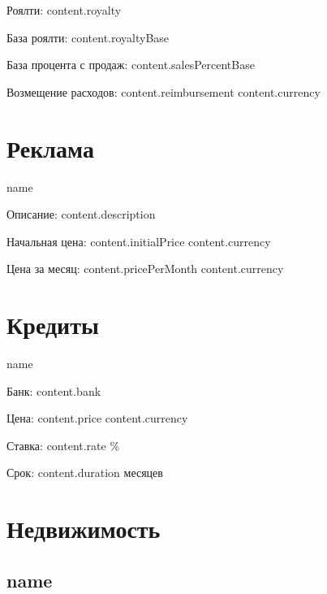 \documentclass[a4paper,12pt]{article}
\begin{document}
{{{{{{{{      Роялти: {{ content.royalty }}
      
      База роялти: {{ content.royaltyBase }}
      
      База процента с продаж: {{ content.salesPercentBase }}

      Возмещение расходов: {{ content.reimbursement }} {{ content.currency }}
  {%
{%

{%
  \section{Реклама}
  {%
    {%
      {{ name }}

      Описание: {{ content.description }}
      
      Начальная цена: {{ content.initialPrice }} {{ content.currency }}
      
      Цена за месяц: {{ content.pricePerMonth }} {{ content.currency }}
    {%
  {%
{%

{%
  \section{Кредиты}
  {%
      {{ name }}

      Банк: {{ content.bank }}
      
      Цена: {{ content.price }} {{ content.currency }}
      
      Ставка: {{ content.rate }} \%

      Срок: {{ content.duration }} месяцев
  {%
{%

{%
  \section{Недвижимость}
  {%
    \subsection{ {{ name }} }

}}}}}}}}}}}}}}}}}}}}}}
\end{document}

